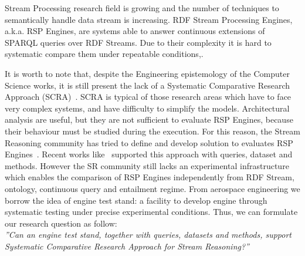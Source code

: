 Stream Processing research field is growing and the number of techniques to semantically handle data stream is increasing. RDF Stream Processing Engines, a.k.a. RSP Engines, are systems able to answer continuous extensions of SPARQL queries over RDF Streams. Due to their complexity it is hard to systematic compare them under repeatable conditions,. 

It is worth to note that, despite the Engineering epistemology of the Computer Science works, it is still present the lack of a Systematic Comparative Research Approach (SCRA)~\cite{Tichy:1995:EEC:209090.209093}. SCRA is typical of those research areas which have to face very complex systems, and have difficulty to simplify the models. Architectural analysis are useful, but they are not sufficient to evaluate RSP Engines, because their behaviour must be studied during the execution. For this reason, the Stream Reasoning community has tried to define and develop solution to evaluates RSP Engines~\cite{DBLP:conf/esws/ScharrenbachUMVB13}. Recent works like~\cite{Zhang2012, LePhuoc2012c, DBLP:conf/semweb/DellAglioCBCV13} supported this approach with queries, dataset and methods. However the SR community still lacks an experimental infrastructure which enables the comparison of RSP Engines independently from RDF Stream, ontology, continuous query and entailment regime.  From aerospace engineering we borrow the idea of engine test stand: a facility to develop engine through systematic testing under precise experimental conditions. Thus, we can formulate our research question as follow:\\

\textit{”Can an engine test stand, together with queries, datasets and methods, support Systematic Comparative Research Approach for Stream Reasoning?”}\\


